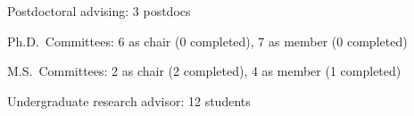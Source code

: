 \begin{veryTightItemize}
    \item Postdoctoral advising: 3 postdocs
    \item Ph.D.\ Committees: 6 as chair (0 completed), 7 as member (0 completed)
    \item M.S.\ Committees:  2 as chair (2 completed), 4 as member (1 completed)
    \item Undergraduate research advisor: 12 students
\end{veryTightItemize}
